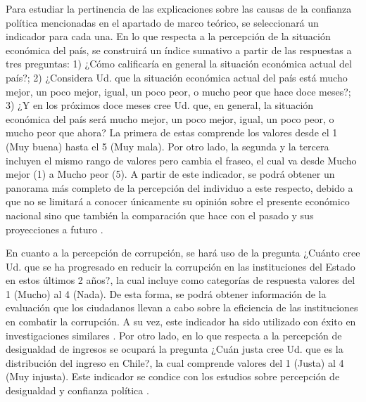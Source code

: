 \documentclass[12pt,twoside]{templates/facsothesis}
\begin{document}
Para estudiar la pertinencia de las explicaciones sobre las causas de la confianza política mencionadas en el apartado de marco teórico, se seleccionará un indicador para cada una. En lo que respecta a la percepción de la situación económica del país, se construirá un índice sumativo a partir de las respuestas a tres preguntas: 1) ¿Cómo calificaría en general la situación económica actual del país?; 2) ¿Considera Ud. que la situación económica actual del país está mucho mejor, un poco mejor, igual, un poco peor, o mucho peor que hace doce meses?; 3) ¿Y en los próximos doce meses cree Ud. que, en general, la situación económica del país será mucho mejor, un poco mejor, igual, un poco peor, o mucho peor que ahora? La primera de estas comprende los valores desde el 1 (Muy buena) hasta el 5 (Muy mala). Por otro lado, la segunda y la tercera incluyen el mismo rango de valores pero cambia el fraseo, el cual va desde Mucho mejor (1) a Mucho peor (5). A partir de este indicador, se podrá obtener un panorama más completo de la percepción del individuo a este respecto, debido a que no se limitará a conocer únicamente su opinión sobre el presente económico nacional sino que también la comparación que hace con el pasado y sus proyecciones a futuro \citep{saldanazunigaConfianzaInstitucionesPoliticas2019}.

En cuanto a la percepción de corrupción, se hará uso de la pregunta ¿Cuánto cree Ud. que se ha progresado en reducir la corrupción en las instituciones del Estado en estos últimos 2 años?, la cual incluye como categorías de respuesta valores del 1 (Mucho) al 4 (Nada). De esta forma, se podrá obtener información de la evaluación que los ciudadanos llevan a cabo sobre la eficiencia de las instituciones en combatir la corrupción. A su vez, este indicador ha sido utilizado con éxito en investigaciones similares \citep{andrianiInstitutionalTrustCorruption2021}. Por otro lado, en lo que respecta a la percepción de desigualdad de ingresos se ocupará la pregunta ¿Cuán justa cree Ud. que es la distribución del ingreso en Chile?, la cual comprende valores del 1 (Justa) al 4 (Muy injusta). Este indicador se condice con los estudios sobre percepción de desigualdad y confianza política \citep{leeEconomicPerformanceIncome2020, wuIncomeInequalityDistributive2019, zmerliIncomeInequalityDistributive2015}.
\end{document}
